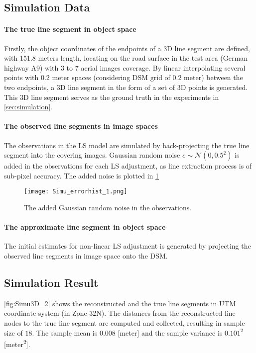 \subsection{Simulation Data}
\label{subsec:simudata}

\paragraph{The true line segment in object space}
Firstly, the object coordinates of the endpoints of a 3D line segment are defined, with 151.8 meters length, locating on the road surface in the test area (German highway A9) with 3 to 7 aerial images coverage. By linear interpolating several points with 0.2 meter spaces (considering DSM grid of 0.2 meter) between the two endpoints, a 3D line segment in the form of a set of 3D points is generated. This 3D line segment serves as the ground truth in the experiments in \cref{sec:simulation}. 

\paragraph{The observed line segments in image spaces}
The observations in the LS model are simulated by back-projecting the true line segment into the covering images. Gaussian random noise $e\sim\mathcal{N}(0,0.5^2)$ is added in the observations for each LS adjustment, as line extraction process is of sub-pixel accuracy. The added noise is plotted in \cref{fig:noise}

\begin{figure}
  \centering
  \texttt{[image: Simu\_errorhist\_1.png]}
  \caption{\small The added Gaussian random noise in the observations.}
  \label{fig:noise}
\end{figure}

\paragraph{The approximate line segment in object space}
The initial estimates for non-linear LS adjustment is generated by projecting the observed line segments in image space onto the DSM.

\clearpage

\subsection{Simulation Result}
\label{subsec:simuresult}

\cref{fig:Simu3D_2} shows the reconstructed and the true line segments in UTM coordinate system (in Zone 32N). The distances from the reconstructed line nodes to the true line segment are computed and collected, resulting in sample size of $18$. The sample mean is $0.008$ [meter] and the sample variance is $0.101^2$ [meter\textsuperscript{2}]. %

